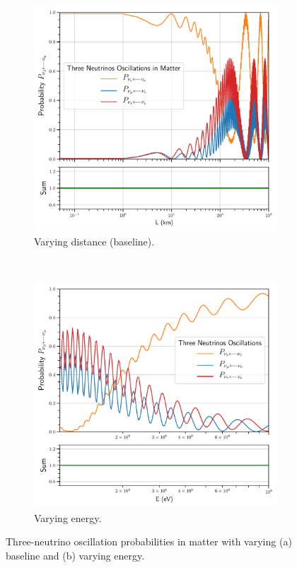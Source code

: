\documentclass[twocolumn,secnumarabic,amssymb, nobibnotes, aps, prd,10pt]{revtex4-1}
\begin{document}
\begin{figure}
\captionsetup[subfigure]{aboveskip=-1.5pt,belowskip=-1.5pt} 
\begin{subfigure}{1.05\linewidth}
\includegraphics[width=\linewidth]{Osc3MatterBaseline.pdf}
\caption{Varying distance (baseline).} 
\label{higgs:sspt} 
\end{subfigure} 
\\
\begin{subfigure}{1.05\linewidth}
\includegraphics[width=\linewidth]{Osc3MatterEnergy.pdf}
\caption{Varying energy.} 
\label{fig:matter} 
\end{subfigure}
\caption{Three-neutrino oscillation probabilities in matter with varying (a) baseline
and (b) varying energy.}
\end{figure}





\end{document}
